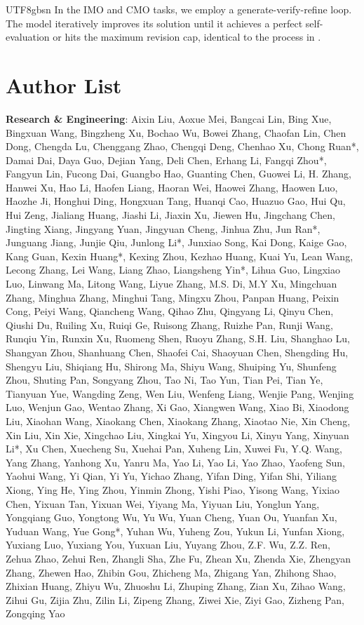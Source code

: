\documentclass[11pt, a4paper, logo, copyright, nonumbering]{deepseek}
\begin{document}
\begin{CJK*}{UTF8}{gbsn}
In the IMO and CMO tasks, we employ a generate-verify-refine loop. The model iteratively improves its solution until it achieves a perfect self-evaluation or hits the maximum revision cap, identical to the process in \citet{deepseek-math-v2}.

\newpage
\section{Author List}
\noindent
\textbf{Research \& Engineering}: 
Aixin Liu,
Aoxue Mei,
Bangcai Lin,
Bing Xue,
Bingxuan Wang,
Bingzheng Xu,
Bochao Wu,
Bowei Zhang,
Chaofan Lin,
Chen Dong,
Chengda Lu,
Chenggang Zhao,
Chengqi Deng,
Chenhao Xu,
Chong Ruan*,
Damai Dai,
Daya Guo,
Dejian Yang,
Deli Chen,
Erhang Li,
Fangqi Zhou*,
Fangyun Lin,
Fucong Dai,
Guangbo Hao,
Guanting Chen,
Guowei Li,
H. Zhang,
Hanwei Xu,
Hao Li,
Haofen Liang,
Haoran Wei,
Haowei Zhang,
Haowen Luo,
Haozhe Ji,
Honghui Ding,
Hongxuan Tang,
Huanqi Cao,
Huazuo Gao,
Hui Qu,
Hui Zeng,
Jialiang Huang,
Jiashi Li,
Jiaxin Xu,
Jiewen Hu,
Jingchang Chen,
Jingting Xiang,
Jingyang Yuan,
Jingyuan Cheng,
Jinhua Zhu,
Jun Ran*,
Junguang Jiang,
Junjie Qiu,
Junlong Li*,
Junxiao Song,
Kai Dong,
Kaige Gao,
Kang Guan,
Kexin Huang*,
Kexing Zhou,
Kezhao Huang,
Kuai Yu,
Lean Wang,
Lecong Zhang,
Lei Wang,
Liang Zhao,
Liangsheng Yin*,
Lihua Guo,
Lingxiao Luo,
Linwang Ma,
Litong Wang,
Liyue Zhang,
M.S. Di,
M.Y Xu,
Mingchuan Zhang,
Minghua Zhang,
Minghui Tang,
Mingxu Zhou,
Panpan Huang,
Peixin Cong,
Peiyi Wang,
Qiancheng Wang,
Qihao Zhu,
Qingyang Li,
Qinyu Chen,
Qiushi Du,
Ruiling Xu,
Ruiqi Ge,
Ruisong Zhang,
Ruizhe Pan,
Runji Wang,
Runqiu Yin,
Runxin Xu,
Ruomeng Shen,
Ruoyu Zhang,
S.H. Liu,
Shanghao Lu,
Shangyan Zhou,
Shanhuang Chen,
Shaofei Cai,
Shaoyuan Chen,
Shengding Hu,
Shengyu Liu,
Shiqiang Hu,
Shirong Ma,
Shiyu Wang,
Shuiping Yu,
Shunfeng Zhou,
Shuting Pan,
Songyang Zhou,
Tao Ni,
Tao Yun,
Tian Pei,
Tian Ye,
Tianyuan Yue,
Wangding Zeng,
Wen Liu,
Wenfeng Liang,
Wenjie Pang,
Wenjing Luo,
Wenjun Gao,
Wentao Zhang,
Xi Gao,
Xiangwen Wang,
Xiao Bi,
Xiaodong Liu,
Xiaohan Wang,
Xiaokang Chen,
Xiaokang Zhang,
Xiaotao Nie,
Xin Cheng,
Xin Liu,
Xin Xie,
Xingchao Liu,
Xingkai Yu,
Xingyou Li,
Xinyu Yang,
Xinyuan Li*,
Xu Chen,
Xuecheng Su,
Xuehai Pan,
Xuheng Lin,
Xuwei Fu,
Y.Q. Wang,
Yang Zhang,
Yanhong Xu,
Yanru Ma,
Yao Li,
Yao Li,
Yao Zhao,
Yaofeng Sun,
Yaohui Wang,
Yi Qian,
Yi Yu,
Yichao Zhang,
Yifan Ding,
Yifan Shi,
Yiliang Xiong,
Ying He,
Ying Zhou,
Yinmin Zhong,
Yishi Piao,
Yisong Wang,
Yixiao Chen,
Yixuan Tan,
Yixuan Wei,
Yiyang Ma,
Yiyuan Liu,
Yonglun Yang,
Yongqiang Guo,
Yongtong Wu,
Yu Wu,
Yuan Cheng,
Yuan Ou,
Yuanfan Xu,
Yuduan Wang,
Yue Gong*,
Yuhan Wu,
Yuheng Zou,
Yukun Li,
Yunfan Xiong,
Yuxiang Luo,
Yuxiang You,
Yuxuan Liu,
Yuyang Zhou,
Z.F. Wu,
Z.Z. Ren,
Zehua Zhao,
Zehui Ren,
Zhangli Sha,
Zhe Fu,
Zhean Xu,
Zhenda Xie,
Zhengyan Zhang,
Zhewen Hao,
Zhibin Gou,
Zhicheng Ma,
Zhigang Yan,
Zhihong Shao,
Zhixian Huang,
Zhiyu Wu,
Zhuoshu Li,
Zhuping Zhang,
Zian Xu,
Zihao Wang,
Zihui Gu,
Zijia Zhu,
Zilin Li,
Zipeng Zhang,
Ziwei Xie,
Ziyi Gao,
Zizheng Pan,
Zongqing Yao


\end{CJK*}
\end{document}
